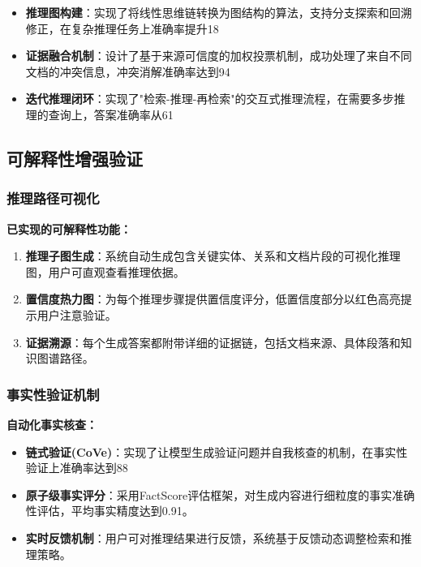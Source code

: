 \begin{itemize}
    \item \textbf{推理图构建}：实现了将线性思维链转换为图结构的算法，支持分支探索和回溯修正，在复杂推理任务上准确率提升18%
    
    \item \textbf{证据融合机制}：设计了基于来源可信度的加权投票机制，成功处理了来自不同文档的冲突信息，冲突消解准确率达到94%
    
    \item \textbf{迭代推理闭环}：实现了"检索-推理-再检索"的交互式推理流程，在需要多步推理的查询上，答案准确率从61%
\end{itemize}

\subsection{可解释性增强验证}

\subsubsection{推理路径可视化}

\textbf{已实现的可解释性功能：}

\begin{enumerate}
    \item \textbf{推理子图生成}：系统自动生成包含关键实体、关系和文档片段的可视化推理图，用户可直观查看推理依据。
    
    \item \textbf{置信度热力图}：为每个推理步骤提供置信度评分，低置信度部分以红色高亮提示用户注意验证。
    
    \item \textbf{证据溯源}：每个生成答案都附带详细的证据链，包括文档来源、具体段落和知识图谱路径。
\end{enumerate}

\subsubsection{事实性验证机制}

\textbf{自动化事实核查：}

\begin{itemize}
    \item \textbf{链式验证(CoVe)}：实现了让模型生成验证问题并自我核查的机制，在事实性验证上准确率达到88%
    
    \item \textbf{原子级事实评分}：采用FactScore评估框架，对生成内容进行细粒度的事实准确性评估，平均事实精度达到0.91。
    \item \textbf{实时反馈机制}：用户可对推理结果进行反馈，系统基于反馈动态调整检索和推理策略。
\end{itemize}

